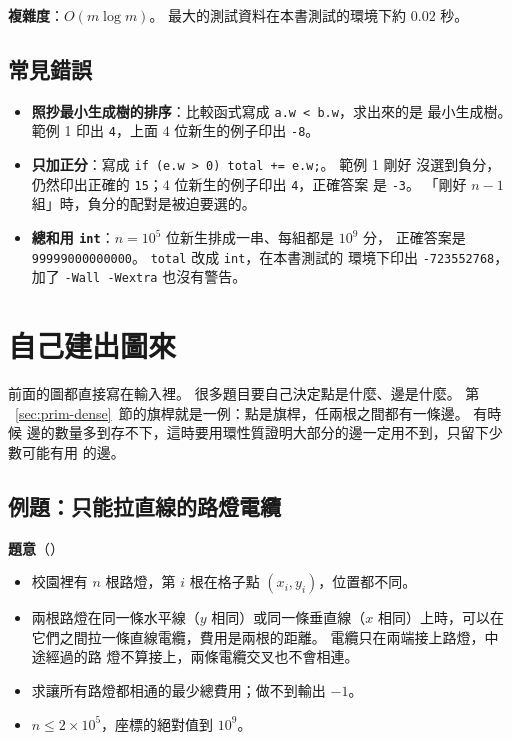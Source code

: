 \textbf{複雜度}：$O(m \log m)$。 最大的測試資料在本書測試的環境下約 $0.02$ 秒。

\subsection{常見錯誤}

\begin{itemize}
\item \textbf{照抄最小生成樹的排序}：比較函式寫成 \texttt{a.w < b.w}，求出來的是
最小生成樹。 範例 1 印出 \texttt{4}，上面 $4$ 位新生的例子印出 \texttt{-8}。
\item \textbf{只加正分}：寫成 \texttt{if (e.w > 0) total += e.w;}。 範例 1 剛好
沒選到負分，仍然印出正確的 \texttt{15}；$4$ 位新生的例子印出 \texttt{4}，正確答案
是 \texttt{-3}。 「剛好 $n - 1$ 組」時，負分的配對是被迫要選的。
\item \textbf{總和用 \texttt{int}}：$n = 10^5$ 位新生排成一串、每組都是 $10^9$ 分，
正確答案是 \texttt{99999000000000}。 \texttt{total} 改成 \texttt{int}，在本書測試的
環境下印出 \texttt{-723552768}，加了 \texttt{-Wall -Wextra} 也沒有警告。
\end{itemize}

\section{自己建出圖來}
\label{sec:mst-build}

前面的圖都直接寫在輸入裡。 很多題目要自己決定點是什麼、邊是什麼。 第
~\ref{sec:prim-dense}~節的旗桿就是一例：點是旗桿，任兩根之間都有一條邊。 有時候
邊的數量多到存不下，這時要用環性質證明大部分的邊一定用不到，只留下少數可能有用
的邊。

\subsection{例題：只能拉直線的路燈電纜}
\label{sec:ex-lamps}

\textbf{題意}（）

\begin{itemize}
\item 校園裡有 $n$ 根路燈，第 $i$ 根在格子點 $(x_i, y_i)$，位置都不同。
\item 兩根路燈在同一條水平線（$y$ 相同）或同一條垂直線（$x$ 相同）上時，可以在
它們之間拉一條直線電纜，費用是兩根的距離。 電纜只在兩端接上路燈，中途經過的路
燈不算接上，兩條電纜交叉也不會相連。
\item 求讓所有路燈都相通的最少總費用；做不到輸出 $-1$。
\item $n \le 2 \times 10^5$，座標的絕對值到 $10^9$。
\end{itemize}

